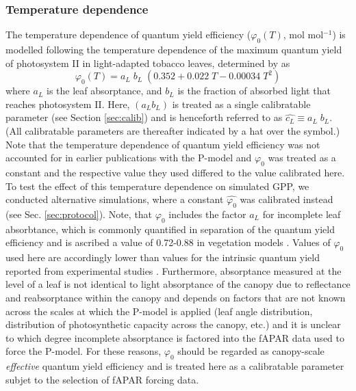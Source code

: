 \documentclass{myreport}
\begin{document}
\subsubsection{Temperature dependence}
\label{sec:tempstress}
The temperature dependence of quantum yield efficiency ($\varphi_0(T)$, mol mol$^{-1}$) is modelled following the temperature dependence of the maximum quantum yield of photosystem II in light-adapted tobacco leaves, determined by \cite{bernacchi03pce} as 
\begin{equation}
\label{eq:bernacchi03}
\varphi_0(T) = a_L \; b_L \; ( 0.352 + 0.022\;T - 0.00034\;T^2 )
\end{equation}
where $a_L$ is the leaf absorptance, and $b_L$ is the fraction of absorbed light that reaches photosystem II. Here, $(a_L b_L)$ is treated as a single calibratable parameter (see Section \ref{sec:calib}) and is henceforth referred to as $\widehat{c_L}\equiv a_L\; b_L$. (All calibratable parameters are thereafter indicated by a hat over the symbol.) Note that the temperature dependence of quantum yield efficiency was not accounted for in earlier publications with the P-model \citep{keenan17natcomm, wang17natpl} and $\varphi_0$ was treated as a constant and the respective value they used differed to the value calibrated here. To test the effect of this temperature dependence on simulated GPP, we conducted alternative simulations, where a constant $\widehat{\varphi_0}$ was calibrated instead (see Sec. \ref{sec:protocol}). Note, that $\varphi_0$ includes the factor $a_L$ for incomplete leaf absorbtance, which is commonly quantified in separation of the quantum yield efficiency and is ascribed a value of 0.72-0.88 in vegetation models \citep{rogers17}. Values of $\varphi_0$ used here are accordingly lower than values for the intrinsic quantum yield reported from experimental studies \citep{long93, singsaas01}. Furthermore, absorptance measured at the level of a leaf is not identical to light absorptance of the canopy  due to reflectance and reabsorptance within the canopy and depends on factors that are not known across the scales at which the P-model is applied (leaf angle distribution, distribution of photosynthetic capacity across the canopy, etc.) and it is unclear to which degree incomplete absorptance is factored into the fAPAR data used to force the P-model. For these reasons, $\varphi_0$ should be regarded as canopy-scale \textit{effective} quantum yield efficiency and is treated here as a calibratable parameter subjet to the selection of fAPAR forcing data. 
\end{document}
